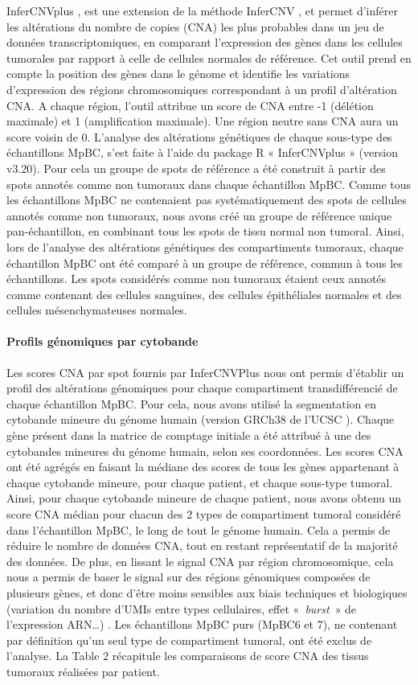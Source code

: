 \documentclass[11pt]{article}
\begin{document}
InferCNVplus \cite{infercnvPlus}, est une extension de la méthode InferCNV \cite{infercnv}, et permet d’inférer les altérations du nombre de copies (CNA) les plus probables dans un jeu de données transcriptomiques, en comparant l’expression des gènes dans les cellules tumorales par rapport à celle de cellules normales de référence. Cet outil prend en compte la position des gènes dans le génome et identifie les variations d’expression des régions chromosomiques correspondant à un profil d’altération CNA. A chaque région, l’outil attribue un score de CNA entre -1 (délétion maximale) et 1 (amplification maximale). Une région neutre sans CNA aura un score voisin de 0.
L’analyse des altérations génétiques de chaque sous-type des échantillons MpBC, s’est faite à l’aide du package R « InferCNVplus » (version v3.20). Pour cela un groupe de spots de référence a été construit à partir des spots annotés comme non tumoraux dans chaque échantillon MpBC. Comme tous les échantillons MpBC ne contenaient pas systématiquement des spots de cellules annotés comme non tumoraux, nous avons créé un groupe de référence unique pan-échantillon, en combinant tous les spots de tissu normal non tumoral. Ainsi, lors de l’analyse des altérations génétiques des compartiments tumoraux, chaque échantillon MpBC ont été comparé à un groupe de référence, commun à tous les échantillons. Les spots considérés comme non tumoraux étaient ceux annotés comme contenant des cellules sanguines, des cellules épithéliales normales et des cellules mésenchymateuses normales.

\paragraph{Profils génomiques par cytobande}

Les scores CNA par spot fournis par InferCNVPlus nous ont permis d’établir un profil des altérations génomiques pour chaque compartiment transdifférencié de chaque échantillon MpBC. Pour cela, nous avons utilisé la segmentation en cytobande mineure du génome humain (version GRCh38 de l’UCSC \cite{UCSCGRCh38}). Chaque gène présent dans la matrice de comptage initiale a été attribué à une des cytobandes mineures du génome humain, selon ses coordonnées. Les scores CNA ont été agrégés en faisant la médiane des scores de tous les gènes appartenant à chaque cytobande mineure, pour chaque patient, et chaque sous-type tumoral. Ainsi, pour chaque cytobande mineure de chaque patient, nous avons obtenu un score CNA médian pour chacun des 2 types de compartiment tumoral considéré dans l’échantillon MpBC, le long de tout le génome humain. Cela a permis de réduire le nombre de données CNA, tout en restant représentatif de la majorité des données. De plus, en lissant le signal CNA par région chromosomique, cela nous a permis de baser le signal sur des régions génomiques composées de plusieurs gènes, et donc d’être moins sensibles aux biais techniques et biologiques (variation du nombre d’UMIs entre types cellulaires, effet « \textit{burst} » de l’expression ARN…) \cite{Suter2011}. Les échantillons MpBC purs (MpBC6 et 7), ne contenant par définition qu’un seul type de compartiment tumoral, ont été exclus de l’analyse. La Table 2 récapitule les comparaisons de score CNA des tissus tumoraux réalisées par patient.
\end{document}
